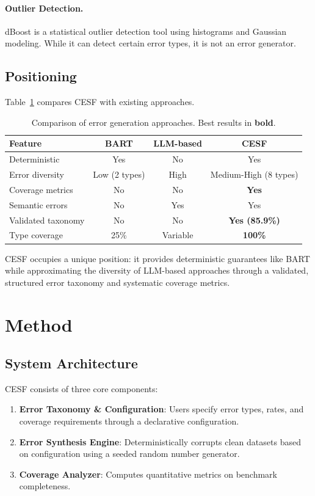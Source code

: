 \documentclass[11pt,a4paper]{article}
\begin{document}
\paragraph{Outlier Detection.}
dBoost \citep{pitclaudel2016dboost} is a statistical outlier detection tool using histograms and Gaussian modeling. While it can detect certain error types, it is not an error generator.

\subsection{Positioning}

Table~\ref{tab:comparison} compares CESF with existing approaches.

\begin{table}[t]
\caption{Comparison of error generation approaches. Best results in \textbf{bold}.}
\label{tab:comparison}
\centering
\begin{tabular}{lccc}
\toprule
Feature & BART & LLM-based & CESF \\
\midrule
Deterministic & Yes & No & Yes \\
Error diversity & Low (2 types) & High & Medium-High (8 types) \\
Coverage metrics & No & No & \textbf{Yes} \\
Semantic errors & No & Yes & Yes \\
Validated taxonomy & No & No & \textbf{Yes (85.9\%)} \\
Type coverage & 25\% & Variable & \textbf{100\%} \\
\bottomrule
\end{tabular}
\end{table}

CESF occupies a unique position: it provides deterministic guarantees like BART while approximating the diversity of LLM-based approaches through a validated, structured error taxonomy and systematic coverage metrics.

\section{Method}
\label{sec:method}

\subsection{System Architecture}

CESF consists of three core components:

\begin{enumerate}
    \item \textbf{Error Taxonomy \& Configuration}: Users specify error types, rates, and coverage requirements through a declarative configuration.
    \item \textbf{Error Synthesis Engine}: Deterministically corrupts clean datasets based on configuration using a seeded random number generator.
    \item \textbf{Coverage Analyzer}: Computes quantitative metrics on benchmark completeness.
\end{enumerate}
\end{document}
